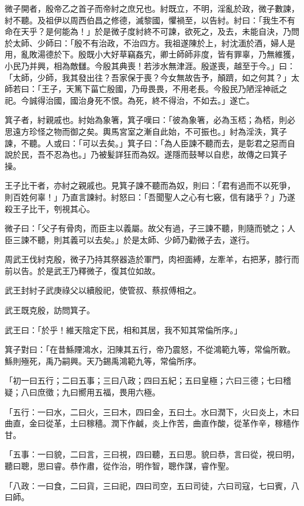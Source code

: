 
\begin{pinyinscope}
微子開者，殷帝乙之首子而帝紂之庶兄也。紂既立，不明，淫亂於政，微子數諫，紂不聽。及祖伊以周西伯昌之修德，滅黎國，懼禍至，以告紂。紂曰：「我生不有命在天乎？是何能為！」於是微子度紂終不可諫，欲死之，及去，未能自決，乃問於太師、少師曰：「殷不有治政，不治四方。我祖遂陳於上，紂沈湎於酒，婦人是用，亂敗湯德於下。殷既小大好草竊姦宄，卿士師師非度，皆有罪辜，乃無維獲，小民乃并興，相為敵讎。今殷其典喪！若涉水無津涯。殷遂喪，越至于今。」曰：「太師，少師，我其發出往？吾家保于喪？今女無故告予，顛躋，如之何其？」太師若曰：「王子，天篤下菑亡殷國，乃毋畏畏，不用老長。今殷民乃陋淫神祇之祀。今誠得治國，國治身死不恨。為死，終不得治，不如去。」遂亡。

箕子者，紂親戚也。紂始為象箸，箕子嘆曰：「彼為象箸，必為玉桮；為桮，則必思遠方珍怪之物而御之矣。輿馬宮室之漸自此始，不可振也。」紂為淫泆，箕子諫，不聽。人或曰：「可以去矣。」箕子曰：「為人臣諫不聽而去，是彰君之惡而自說於民，吾不忍為也。」乃被髪詳狂而為奴。遂隱而鼓琴以自悲，故傳之曰箕子操。

王子比干者，亦紂之親戚也。見箕子諫不聽而為奴，則曰：「君有過而不以死爭，則百姓何辜！」乃直言諫紂。紂怒曰：「吾聞聖人之心有七竅，信有諸乎？」乃遂殺王子比干，刳視其心。

微子曰：「父子有骨肉，而臣主以義屬。故父有過，子三諫不聽，則隨而號之；人臣三諫不聽，則其義可以去矣。」於是太師、少師乃勸微子去，遂行。

周武王伐紂克殷，微子乃持其祭器造於軍門，肉袒面縛，左牽羊，右把茅，膝行而前以告。於是武王乃釋微子，復其位如故。

武王封紂子武庚祿父以續殷祀，使管叔、蔡叔傅相之。

武王既克殷，訪問箕子。

武王曰：「於乎！維天陰定下民，相和其居，我不知其常倫所序。」

箕子對曰：「在昔鯀陻鴻水，汨陳其五行，帝乃震怒，不從鴻範九等，常倫所斁。鯀則殛死，禹乃嗣興。天乃錫禹鴻範九等，常倫所序。

「初一曰五行；二曰五事；三曰八政；四曰五紀；五曰皇極；六曰三德；七曰稽疑；八曰庶徵；九曰嚮用五福，畏用六極。

「五行：一曰水，二曰火，三曰木，四曰金，五曰土。水曰潤下，火曰炎上，木曰曲直，金曰從革，土曰稼穡。潤下作鹹，炎上作苦，曲直作酸，從革作辛，稼穡作甘。

「五事：一曰貌，二曰言，三曰視，四曰聽，五曰思。貌曰恭，言曰從，視曰明，聽曰聰，思曰睿。恭作肅，從作治，明作智，聰作謀，睿作聖。

「八政：一曰食，二曰貨，三曰祀，四曰司空，五曰司徒，六曰司寇，七曰賓，八曰師。


\end{pinyinscope}
